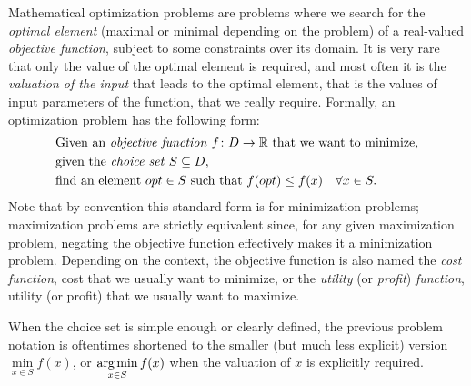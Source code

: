 	Mathematical optimization problems are problems where we search for the \emph{optimal element} (maximal or minimal depending on the problem) of a real-valued \emph{objective function}, subject to some constraints over its domain.
	It is very rare that only the value of the optimal element is required, and most often it is the \emph{valuation of the input} that leads to the optimal element, that is the values of input parameters of the function, that we really require.
	Formally, an optimization problem has the following form: %
	\begin{align*}
		&\text{Given an \emph{objective function} }f\colon D \to \mathbb{R}\text{ that we want to minimize,}\\
		&\text{given the \emph{choice set} }S \subseteq D,\\
		&\text{find an element }opt \in S\text{ such that }f(opt) \leq f(x)\quad\forall x\in S.
	\end{align*}
	Note that by convention this standard form is for minimization problems; maximization problems are strictly equivalent since, for any given maximization problem, negating the objective function effectively makes it a minimization problem.
	Depending on the context, the objective function is also named the \emph{cost function}, cost that we usually want to minimize, or the \emph{utility} (or \emph{profit}) \emph{function}, utility (or profit) that we usually want to maximize.

	When the choice set is simple enough or clearly defined, the previous problem notation is oftentimes shortened to the smaller (but much less explicit) version $\min\limits_{x\in S}f(x)$, or $\operatorname*{arg\,min}\limits_{x\in S}f(x)$ when the valuation of $x$ is explicitly required.

